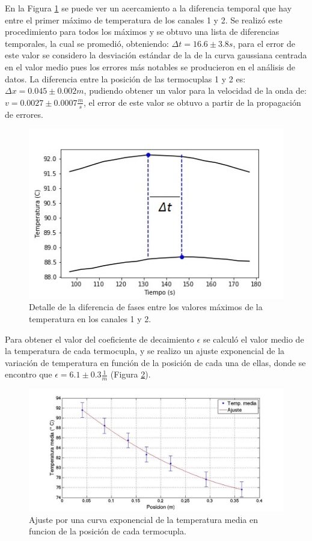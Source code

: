 \documentclass[twoside,twocolumn,a4paper]{article}
\begin{document}
\par
En la Figura \ref{fig:deltat} se puede ver un acercamiento a la diferencia temporal que hay entre el primer m\'aximo de temperatura de los canales 1 y 2. Se realiz\'o este procedimiento para todos los m\'aximos y se obtuvo una lista de diferencias temporales, la cual se promedi\'o, obteniendo: $\Delta t = 16.6 \pm 3.8 s$, para el error de este valor se considero la desviaci\'on est\'andar de la de la curva gaussiana centrada en el valor medio pues los errores m\'as notables se producieron en el an\'alisis de datos. La diferencia entre la posici\'on de las termocuplas 1 y 2 es: $\Delta x = 0.045  \pm 0.002m$, pudiendo obtener un valor para la velocidad de la onda de: $v =0.0027 \pm 0.0007 \frac{m}{s} $, el error de este valor se obtuvo a partir de la propagaci\'on de errores.

\begin{figure}[H]
\includegraphics[width=\linewidth]{deltat.jpg}
\caption{Detalle de la diferencia de fases entre los valores m\'aximos de la temperatura en los canales 1 y 2.}
\label{fig:deltat}
\end{figure}


Para obtener el valor del coeficiente de decaimiento $\epsilon$ se calcul\'o el valor medio de la temperatura de cada termocupla, y se realizo un ajuste exponencial de la variaci\'on de temperatura en funci\'on de la posici\'on de cada una de ellas, donde se encontro que $\epsilon =6.1 \pm 0.3 \frac{1}{m} $ (Figura \ref{fig:decaimiento}).

\begin{figure}[H]
\includegraphics[width=\linewidth]{decaimiento.jpg}
\caption{Ajuste por una curva exponencial de la temperatura media en funcion de la posici\'on de cada termocupla.}
\label{fig:decaimiento}
\end{figure}
\end{document}
